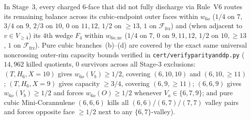 \documentclass[11pt,reqno]{amsart}
\theoremstyle{plain}
\theoremstyle{definition}
\theoremstyle{remark}
\newcommand{\Ffrz}{\mathcal{F}_{\mathrm{frz}}}
\newcommand{\Vge}{V_{\ge 4}}
\DeclareRobustCommand{\_}{\ifmmode\text{\textunderscore}\else\textunderscore\allowbreak\fi}
\begin{document}
\begin{itemize}[leftmargin=1.8em]
\begin{enumerate}[label=(\roman*),leftmargin=2.0em]
\begin{itemize}[leftmargin=1.4em]
      \end{itemize}
      In Stage~3, every charged $6$-face that did not fully discharge via Rule~V6 routes its remaining balance across its cubic-endpoint outer faces within $w_{6o}$ ($1/4$ on $7$, $3/4$ on $9$, $2/3$ on $10$, $0$ on $11, 12$, $1/2$ on $\ge 13$, $1$ on $\Ffrz$) and (when adjacent to $v \in \Vge$) its $4$th wedge $F_4$ within $w_{6o,\mathrm{nc}}$ ($1/4$ on $7$, $0$ on $9, 11, 12$, $1/2$ on $10, \ge 13$, $1$ on $\Ffrz$). Pure cubic branches~(b)--(d) are covered by the exact same universal noncrossing outer-rim capacity bounds verified in \texttt{cert/verify\_parity\_and\_dp.py} ($14{,}962$ killed quotients, $0$ survivors across all Stage-3 exclusions: $(T, H_6, X=10)$ gives $w_{6o}(V_b) \ge 1/2$, covering $(6, 10, 10)$ and $(6, 10, \ge 11)$; $(T, H_6, X=9)$ gives capacity $\ge 3/4$, covering $(6, 9, \ge 11)$; $(6, 6, 9)$ gives $w_{6o}(V_b) \ge 1/2$ and forces $w_{6o}(O) \ge 1/2$ whenever $V_a \in \{6, 7, 9\}$; and pure cubic Mini-Corannulene $(6, 6, 6)$ kills all $(6,6)/(6,7)/(7,7)$ valley pairs and forces opposite face $\ge 1/2$ next to any $\{6,7\}$-valley).
  \end{enumerate}


\end{itemize}
\end{document}
